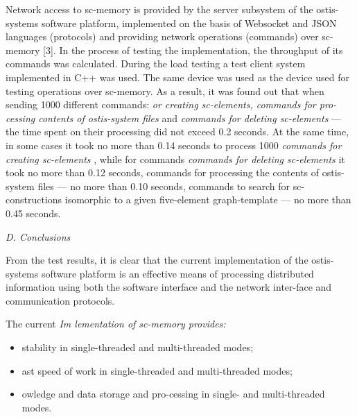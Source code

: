 \documentclass[10pt, a4paper]{article}
\begin{document}
\begin{multicols}{2}
Network access to sc-memory is provided by the
server subsystem of the ostis-systems software platform,
implemented on the basis of Websocket and JSON
languages (protocols) and providing network operations
(commands) over sc-memory [3].
In the process of testing the implementation, the
throughput of its commands was calculated. During the
load testing a test client system implemented in C++ was
used. The same device was used as the device used for
testing operations over sc-memory. As a result, it was
found out that when sending 1000 different commands:
\textit{or creating sc-elements, commands for pro-cessing contents of ostis-system files} and \textit{commands for
deleting sc-elements} — the time spent on their processing
did not exceed 0.2 seconds. At the same time, in some
cases it took no more than 0.14 seconds to process 1000 \textit{commands for creating sc-elements}
, while for commands \textit{commands
for deleting sc-elements}
 it took no more than 0.12
seconds, commands for processing the contents of ostis-system files — no more than 0.10 seconds, commands
to search for sc-constructions isomorphic to a given five-element graph-template — no more than 0.45 seconds.

\begin{flushleft} %
\textit{D. Conclusions}
\setlength{\parskip}{0pt}
\setlength{\itemsep}{0pt}
\end{flushleft}

From the test results, it is clear that the current
implementation of the ostis-systems software platform is
an effective means of processing distributed information
using both the software interface and the network inter-face and communication protocols.

\begin{center}  
The current
    \textit{Im lementation of sc-memory provides:}
\end{center}

\begin{itemize}
    \item stability in single-threaded and multi-threaded
modes; \setlength{\parskip}{0pt}
\setlength{\itemsep}{0pt}
    \item ast speed of work in single-threaded and multi-threaded modes;\setlength{\parskip}{0pt}
\setlength{\itemsep}{0pt}
    \item owledge and data storage and pro-cessing in single- and multi-threaded modes.\setlength{\parskip}{0pt}
\setlength{\itemsep}{0pt}
\end{itemize}


\end{multicols}
\end{document}
